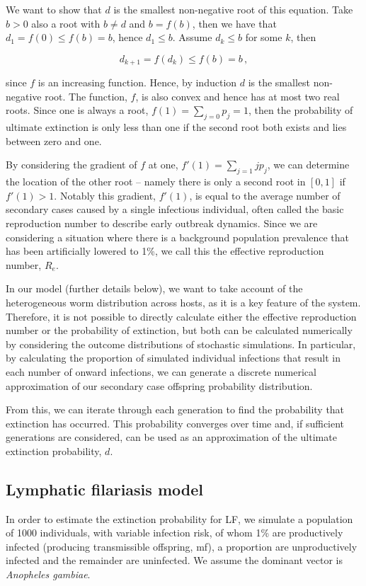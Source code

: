 We want to show that $d$ is the smallest non-negative root of this equation. Take $b>0$ also a root with $b\neq d$ and $b=f(b)$, then we have that $d_1=f(0)\leq f(b)=b$, hence $d_1\leq b$. Assume $d_k\leq b$ for some $k$, then

\begin{equation}
    d_{k+1} = f(d_k) \leq f(b) = b \,,
\end{equation}

since $f$ is an increasing function. Hence, by induction $d$ is the smallest non-negative root. The function, $f$, is also convex and hence has at most two real roots. Since one is always a root, $f(1)=\sum_{j=0}p_j=1$, then the probability of ultimate extinction is only less than one if the second root both exists and lies between zero and one. 

By considering the gradient of $f$ at one, $f'(1) = \sum_{j=1}jp_j$, we can determine the location of the other root -- namely there is only a second root in $[0,1]$ if $f'(1)>1$. Notably this gradient, $f'(1)$, is equal to the average number of secondary cases caused by a single infectious individual, often called the basic reproduction number to describe early outbreak dynamics. Since we are considering a situation where there is a background population prevalence that has been artificially lowered to 1\%, we call this the effective reproduction number, $R_e$.

In our model (further details below), we want to take account of the heterogeneous worm distribution across hosts, as it is a key feature of the system. Therefore, it is not possible to directly calculate either the effective reproduction number or the probability of extinction, but both can be calculated numerically by considering the outcome distributions of stochastic simulations. In particular, by calculating the proportion of simulated individual infections that result in each number of onward infections, we can generate a discrete numerical approximation of our secondary case offspring probability distribution. 

From this, we can iterate through each generation to find the probability that extinction has occurred. This probability converges over time and, if sufficient generations are considered, can be used as an approximation of the ultimate extinction probability, $d$.

\subsection[LF model]{Lymphatic filariasis model}
In order to estimate the extinction probability for LF, we simulate a population of 1000 individuals, with variable infection risk, of whom 1\% are productively infected (producing transmissible offspring, mf), a proportion are unproductively infected and the remainder are uninfected. We assume the dominant vector is \textit{Anopheles gambiae}. 

